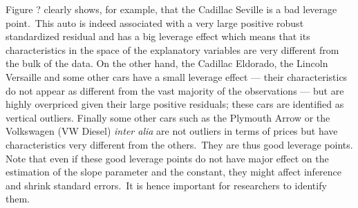 \begin{stexample}
Figure ?%
clearly shows, for
example, that the Cadillac Seville is a bad leverage point.\ This auto is
indeed associated with a very large positive robust standardized residual and
has a big leverage effect which means that its characteristics in the space of
the explanatory variables are very different from the bulk of the data. On the
other hand, the Cadillac Eldorado, the Lincoln Versaille and some other cars
have a small leverage effect --- their characteristics do not appear as
different from the vast majority of the observations --- but are highly
overpriced given their large positive residuals; these cars are identified as
vertical outliers. Finally some other cars such as the Plymouth Arrow or the
Volkswagen (VW Diesel) \emph{inter alia} are not outliers in terms of prices
but have characteristics very different from the others.\ They are thus good
leverage points. Note that even if these good leverage points do not have
major effect on the estimation of the slope parameter and the constant, they
might affect inference and shrink standard errors.\ It is hence important for
researchers to identify them.
\end{stexample}


